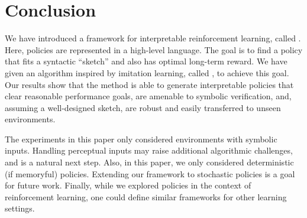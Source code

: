 \section{Conclusion}
\label{sec:conclusion}

We have introduced a framework for interpretable reinforcement learning, called \pirl. Here, policies are represented in a high-level language. The goal is to find a policy that fits a syntactic ``sketch'' and also has optimal long-term reward. We have given an algorithm inspired by imitation learning, called \algo, to achieve this goal. Our results show that the method is able to generate interpretable policies that clear reasonable performance goals, are amenable to symbolic verification, and, assuming a well-designed sketch, are robust and easily transferred to unseen environments.

The experiments in this paper only considered environments with symbolic inputs. Handling perceptual inputs may raise additional algorithmic challenges, and is a natural next step. Also, in this paper, we only considered deterministic (if memoryful) policies. Extending our framework to stochastic policies is a goal for future work. 
Finally, while we explored policies in the context of reinforcement learning, one could define similar frameworks for other learning settings. 
